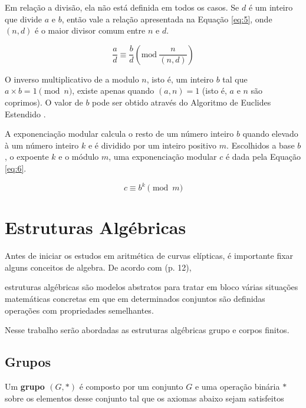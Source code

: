 Em relação a divisão, ela não está definida em todos os casos. Se \(d\) é um inteiro que divide \(a\) e \(b\), então vale a relação apresentada na Equação \ref{eq:5}, onde \((n, d)\) é o maior divisor comum entre \(n\) e \(d\).

\begin{equation}
  \frac{a}{d} \equiv \frac{b}{d}\left(\mbox{mod}\ \frac{n}{(n,d)}\right) \label{eq:5}
\end{equation}

O inverso multiplicativo de a modulo \(n\), isto é, um inteiro \(b\) tal que \(a \times b = 1 \pmod  n\), existe apenas quando \((a, n) = 1\) (isto é, $a$ e $n$ são coprimos). O valor de \(b\) pode ser obtido através do Algoritmo de Euclides Estendido \cite{Halim:2013}.
\par A exponenciação modular calcula o resto de um número inteiro \(b\) quando elevado à um número inteiro \(k\) e é dividido por um inteiro positivo \(m\). Escolhidos a base \(b\), o expoente \(k\) e o módulo \(m\), uma exponenciação modular \(c\) é dada pela Equação \ref{eq:6}.

\begin{equation}
  c \equiv b^{k}\pmod m \label{eq:6}
\end{equation}

%
%
\section{Estruturas Algébricas}

Antes de iniciar os estudos em aritmética de curvas elípticas, é importante
fixar alguns conceitos de algebra. De acordo com \cite{Hefez:2008}(p. 12), 

\begin{citacao}
estruturas algébricas são modelos abstratos para tratar em bloco várias situações matemáticas concretas em que em determinados conjuntos são definidas operações com propriedades semelhantes.
\end{citacao}

Nesse trabalho serão abordadas as estruturas algébricas grupo
e corpos finitos.

%
%

\subsection{Grupos}

Um \textbf{grupo \((G,*)\)} é composto por um conjunto \(G\) e uma operação binária \(*\) sobre os elementos desse conjunto tal que os axiomas abaixo sejam satisfeitos\cite{Gilbert:2004}

